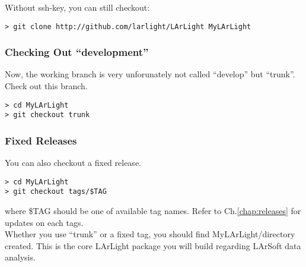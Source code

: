 Without ssh-key, you can still checkout:
\begin{lstlisting}
> git clone http://github.com/larlight/LArLight MyLArLight
\end{lstlisting}

\subsubsection{Checking Out ``development''}
Now, the working branch is very unforunately not called ``develop'' but ``trunk''.
Check out this branch.
\begin{lstlisting}
> cd MyLArLight
> git checkout trunk
\end{lstlisting}

\subsubsection{Fixed Releases}
You can also checkout a fixed release. 
\begin{lstlisting}
> cd MyLArLight
> git checkout tags/$TAG
\end{lstlisting}
where {\ttfamily \$TAG} should be one of available tag names.
Refer to Ch.\ref{chap:releases} for updates on each tags.\\


Whether you use ``trunk'' or a fixed tag, you should find {\ttfamily MyLArLight/}\Core directory created. 
This is the core LArLight package you will build regarding LArSoft data analysis.

